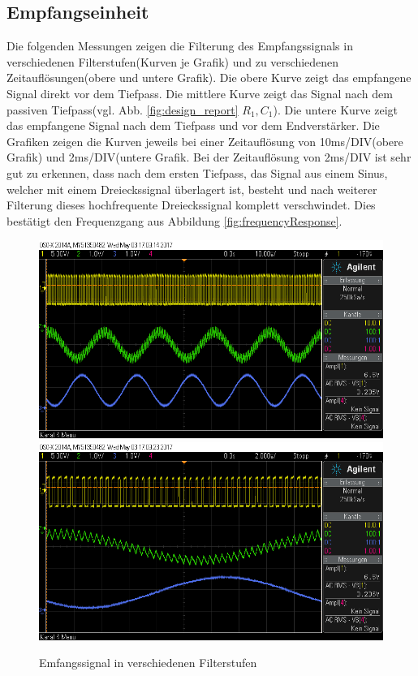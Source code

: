\subsection{Empfangseinheit}
Die folgenden Messungen zeigen die Filterung des Empfangssignals in verschiedenen Filterstufen(Kurven je Grafik) und zu verschiedenen Zeitauflösung\-en(obere und untere Grafik). Die obere Kurve zeigt das empfangene Signal direkt vor dem Tiefpass. Die mittlere Kurve zeigt das Signal nach dem passiven Tiefpass(vgl. Abb. \ref{fig:design_report} $R_1,C_1$). Die untere Kurve zeigt das empfangene Signal nach dem Tiefpass und vor dem Endverstärker. Die Grafiken zeigen die Kurven jeweils bei einer Zeitauflösung von 10ms/DIV(obere Grafik) und 2ms/DIV(untere Grafik. Bei der Zeitauflösung von 2ms/DIV ist sehr gut zu erkennen, dass nach dem ersten Tiefpass, das Signal aus einem Sinus, welcher mit einem Dreieckssignal überlagert ist, besteht und nach weiterer Filterung dieses hochfrequente Dreieckssignal komplett verschwindet. Dies bestätigt den Frequenzgang aus Abbildung \ref{fig:frequencyResponse}.
\begin{figure}[H]
	\centering
	\includegraphics[scale=0.5]{gfx/osziScreens/scope_10.png}
\includegraphics[scale=0.5]{gfx/osziScreens/scope_11.png}
	\caption{Emfangssignal in verschiedenen Filterstufen}
\end{figure}
